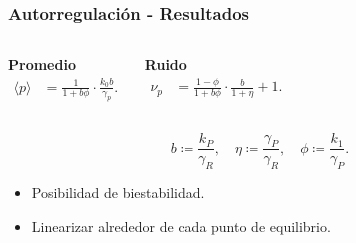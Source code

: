 \documentclass{beamer}
\begin{document}
\begin{frame}
\frametitle{Autorregulaci\'on - Resultados}
\begin{columns}[c]

\centering \textbf{Promedio}
\begin{align*}
\langle p \rangle &= \frac{1}{1+b\phi} \cdot \frac{k_0b}{\gamma_p}.
\end{align*}

\centering \textbf{Ruido}
\begin{align*}
\nu_p &= \frac{1-\phi}{1+b\phi} \cdot \frac{b}{1+\eta}+1.
\end{align*}
\end{columns}

\vspace{3 mm}

\begin{equation*}
  b \coloneqq \frac{k_P}{\gamma_R}, \quad \eta \coloneqq \frac{\gamma_P}{\gamma_R}, \quad \phi \coloneqq \frac{k_1}{\gamma_P}.
\end{equation*}

\begin{itemize}
\item Posibilidad de biestabilidad.
\item Linearizar alrededor de cada punto de equilibrio.
\end{itemize}


\end{frame}

\end{document}
